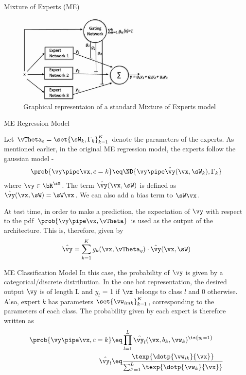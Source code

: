 \documentclass{article}
\begin{document}
\begin{psection}{Mixture of Experts (ME)}
	\begin{figure}[htpb]
		\centering
		\includegraphics[width=0.7\textwidth]{includes/me.png}
		\caption{Graphical representaion of a standard Mixture of Experts model}
		\label{fig:me}
	\end{figure}

	\begin{psubsection}{ME Regression Model}

		Let $\vTheta_e = \set{\sW_k, \Gamma_k}_{k = 1}^{K}$ denote the parameters of the experts. As mentioned earlier, in the original ME regression model, the experts follow the gaussian model -
		\begin{align*}
			\prob{\vy \pipe \vx, c = k} \eq \ND{\vy \pipe \hat{\vy}(\vx, \sW_k), \Gamma_k}
		\end{align*}
		where $\vy \in \bR^\sM$. The term $\hat{\vy}(\vx, \sW)$ is defined as $\hat{\vy}(\vx, \sW) = \sW \vx$. We can also add a bias term to $\sW \vx$.

		At test time, in order to make a prediction, the expectation of $\vy$ with respect to the pdf $\prob{\vy \pipe \vx,\vTheta}$ is used as the output of the architecture. This is, therefore, given by
		\begin{align*}
			\hat{\vy} = \sum_{k = 1}^K g_k(\vx, \vTheta_g) \cdot \hat{\vy}(\vx, \sW)
		\end{align*}
	\end{psubsection}

	\begin{psubsection}{ME Classification Model}
		In this case, the probability of $\vy$ is given by a categorical/discrete distribution. In the one hot representation, the desired output $\vy$ is of length L and $y_l$ = 1 if $\vx$ belongs to class $l$ and 0 otherwise. Also, expert $k$ has parameters $\set{\vw_{imk}}_{k = 1}^K$, corresponding to the parameters of each class. The probability given by each expert is therefore written as
		\begin{align*}
			\prob{\vy \pipe \vx, c = k} &\eq \prod_{l = 1}^L \hat{\vy_l}(\vx, b_k, \vw_k)^{\is{y_l = 1}} \\
			\hat{\vy_l} &\eq \frac{\texp{\dotp{\vw_{ik}}{\vx}}}{\sum_{l' = 1}^L \texp{\dotp{\vw_k}{\vx}}}
		\end{align*}


\end{psubsection}
\end{psection}
\end{document}
